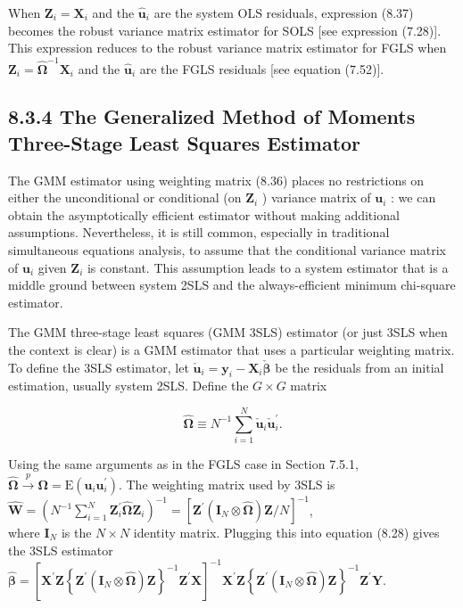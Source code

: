 \documentclass[10pt]{article}
\begin{document}
When $\mathbf{Z}_{i}=\mathbf{X}_{i}$ and the $\hat{\mathbf{u}}_{i}$ are the system OLS residuals, expression (8.37) becomes the robust variance matrix estimator for SOLS [see expression (7.28)]. This expression reduces to the robust variance matrix estimator for FGLS when $\mathbf{Z}_{i}=\hat{\boldsymbol{\Omega}}^{-1} \mathbf{X}_{i}$ and the $\hat{\mathbf{u}}_{i}$ are the FGLS residuals [see equation (7.52)].

\subsection*{8.3.4 The Generalized Method of Moments Three-Stage Least Squares Estimator}
The GMM estimator using weighting matrix (8.36) places no restrictions on either the unconditional or conditional (on $\mathbf{Z}_{i}$ ) variance matrix of $\mathbf{u}_{i}$ : we can obtain the asymptotically efficient estimator without making additional assumptions. Nevertheless, it is still common, especially in traditional simultaneous equations analysis, to assume that the conditional variance matrix of $\mathbf{u}_{i}$ given $\mathbf{Z}_{i}$ is constant. This assumption leads to a system estimator that is a middle ground between system 2SLS and the always-efficient minimum chi-square estimator.

The GMM three-stage least squares (GMM 3SLS) estimator (or just 3SLS when the context is clear) is a GMM estimator that uses a particular weighting matrix. To define the 3SLS estimator, let $\check{\mathbf{u}}_{i}=\mathbf{y}_{i}-\mathbf{X}_{i} \check{\boldsymbol{\beta}}$ be the residuals from an initial estimation, usually system 2SLS. Define the $G \times G$ matrix


\begin{equation*}
\hat{\boldsymbol{\Omega}} \equiv N^{-1} \sum_{i=1}^{N} \check{\mathbf{u}}_{i} \check{\mathbf{u}}_{i}^{\prime} . \tag{8.38}
\end{equation*}


Using the same arguments as in the FGLS case in Section 7.5.1, $\hat{\boldsymbol{\Omega}} \xrightarrow{p} \boldsymbol{\Omega}=\mathrm{E}\left(\mathbf{u}_{i} \mathbf{u}_{i}^{\prime}\right)$. The weighting matrix used by 3SLS is\\
$\hat{\mathbf{W}}=\left(N^{-1} \sum_{i=1}^{N} \mathbf{Z}_{i}^{\prime} \hat{\mathbf{\Omega}} \mathbf{Z}_{i}\right)^{-1}=\left[\mathbf{Z}^{\prime}\left(\mathbf{I}_{N} \otimes \hat{\mathbf{\Omega}}\right) \mathbf{Z} / N\right]^{-1}$,\\
where $\mathbf{I}_{N}$ is the $N \times N$ identity matrix. Plugging this into equation (8.28) gives the 3SLS estimator\\
$\hat{\boldsymbol{\beta}}=\left[\mathbf{X}^{\prime} \mathbf{Z}\left\{\mathbf{Z}^{\prime}\left(\mathbf{I}_{N} \otimes \hat{\boldsymbol{\Omega}}\right) \mathbf{Z}\right\}^{-1} \mathbf{Z}^{\prime} \mathbf{X}\right]^{-1} \mathbf{X}^{\prime} \mathbf{Z}\left\{\mathbf{Z}^{\prime}\left(\mathbf{I}_{N} \otimes \hat{\boldsymbol{\Omega}}\right) \mathbf{Z}\right\}^{-1} \mathbf{Z}^{\prime} \mathbf{Y}$.
\end{document}
